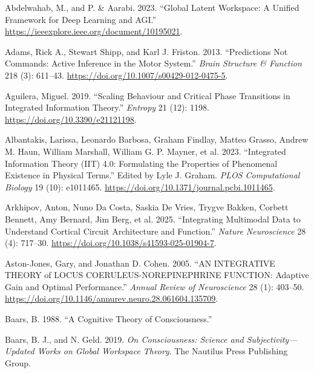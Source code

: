 \documentclass[
  a4paper]{article}
\newlength{\cslhangindent}
\newenvironment{CSLReferences}[2] %
 {\begin{list}{}{%
  \setlength{\itemindent}{0pt}
  \setlength{\leftmargin}{0pt}
  \setlength{\parsep}{0pt}
  \ifodd #1
   \setlength{\leftmargin}{\cslhangindent}
   \setlength{\itemindent}{-1\cslhangindent}
  \fi
  \setlength{\itemsep}{#2\baselineskip}}}
 {\end{list}}
\begin{document}
\protect{}\label{refs}
\begin{CSLReferences}{1}{0}
Abdelwahab, M., and P. \& Aarabi. 2023. {``Global Latent Workspace: A
Unified Framework for Deep Learning and {AGI}.''}
\url{https://ieeexplore.ieee.org/document/10195021}.

Adams, Rick A., Stewart Shipp, and Karl J. Friston. 2013. {``Predictions
Not Commands: Active Inference in the Motor System.''} \emph{Brain
Structure \& Function} 218 (3): 611--43.
\url{https://doi.org/10.1007/s00429-012-0475-5}.

Aguilera, Miguel. 2019. {``Scaling Behaviour and Critical Phase
Transitions in Integrated Information Theory.''} \emph{Entropy} 21 (12):
1198. \url{https://doi.org/10.3390/e21121198}.

Albantakis, Larissa, Leonardo Barbosa, Graham Findlay, Matteo Grasso,
Andrew M. Haun, William Marshall, William G. P. Mayner, et al. 2023.
{``Integrated Information Theory ({IIT}) 4.0: Formulating the Properties
of Phenomenal Existence in Physical Terms.''} Edited by Lyle J. Graham.
\emph{PLOS Computational Biology} 19 (10): e1011465.
\url{https://doi.org/10.1371/journal.pcbi.1011465}.

Arkhipov, Anton, Nuno Da Costa, Saskia De Vries, Trygve Bakken, Corbett
Bennett, Amy Bernard, Jim Berg, et al. 2025. {``Integrating Multimodal
Data to Understand Cortical Circuit Architecture and Function.''}
\emph{Nature Neuroscience} 28 (4): 717--30.
\url{https://doi.org/10.1038/s41593-025-01904-7}.

Aston-Jones, Gary, and Jonathan D. Cohen. 2005. {``{AN INTEGRATIVE
THEORY} of {LOCUS COERULEUS-NOREPINEPHRINE FUNCTION}: Adaptive Gain and
Optimal Performance.''} \emph{Annual Review of Neuroscience} 28 (1):
403--50. \url{https://doi.org/10.1146/annurev.neuro.28.061604.135709}.

Baars, B. 1988. {``A Cognitive Theory of Consciousness.''}

Baars, B. J., and N. Geld. 2019. \emph{On Consciousness: Science and
Subjectivity---Updated Works on Global Workspace Theory}. The Nautilus
Press Publishing Group.


\end{CSLReferences}
\end{document}

